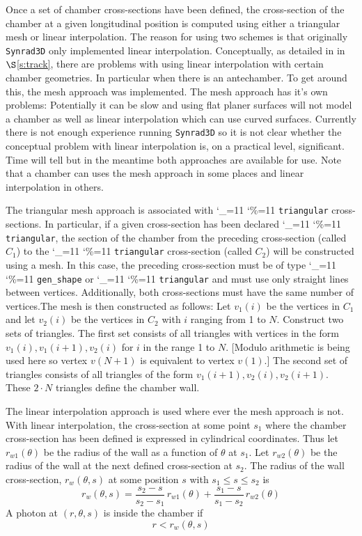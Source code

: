 \documentclass[11pt]{article}
\newcommand{\sref}[1]{$\S$\ref{#1}}
\newcommand{\srthree}{\texttt{Synrad3D}\xspace}
\newcommand\ttcmd{\begingroup\catcode`\_=11 \catcode`\%=11 \dottcmd}
\newcommand\dottcmd[1]{\texttt{#1}\endgroup}
\newcommand{\Begineq}{\begin{equation}}
\newcommand{\Endeq}{\end{equation}}
\newcommand{\vn}{\ttcmd}
\begin{document}
{Once a set of chamber cross-sections have been defined, the
cross-section of the chamber at a given longitudinal position is
computed using either a triangular mesh or linear interpolation. The
reason for using two schemes is that originally \srthree only
implemented linear interpolation.  Conceptually, as detailed in in
\sref{s:track}, there are problems with using linear interpolation
with certain chamber geometries. In particular when there is an
antechamber. To get around this, the mesh approach was implemented.
The mesh approach has it's own problems: Potentially it can be slow
and using flat planer surfaces will not model a chamber as well as
linear interpolation which can use curved surfaces. Currently there
is not enough experience running \srthree so it is not clear whether
the conceptual problem with linear interpolation is, on a practical
level, significant. Time will tell but in the meantime both approaches
are available for use. Note that a chamber can uses the mesh approach
in some places and linear interpolation in others.

The triangular mesh approach is associated with \vn{triangular}
cross-sections. In particular, if a given cross-section has been
declared \vn{triangular}, the section of the chamber from the
preceding cross-section (called $C_1$) to the \vn{triangular}
cross-section (called $C_2$) will be constructed using a mesh. In this
case, the preceding cross-section must be of type \vn{gen_shape} or
\vn{triangular} and must use only straight lines between
vertices. Additionally, both cross-sections must have the same number
of vertices.The mesh is then constructed as follows: Let $v_1(i)$ be
the vertices in $C_1$ and let $v_2(i)$ be the vertices in $C_2$ with
$i$ ranging from 1 to $N$. Construct two sets of triangles. The first
set consists of all triangles with vertices in the form $v_1(i),
v_1(i+1), v_2(i)$ for $i$ in the range 1 to $N$. [Modulo arithmetic is
being used here so vertex $v(N+1)$ is equivalent to vertex $v(1)$.]
The second set of triangles consists of all triangles of the form
$v_1(i+1), v_2(i), v_2(i+1)$. These $2 \cdot N$ triangles define the
chamber wall.

The linear interpolation approach is used where ever the mesh approach
is not.  With linear interpolation, the cross-section at some point
$s_1$ where the chamber cross-section has been defined is expressed in
cylindrical coordinates.  Thus let $r_{w1}(\theta)$ be the radius of
the wall as a function of $\theta$ at $s_1$.  Let $r_{w2}(\theta)$ be
the radius of the wall at the next defined cross-section at $s_2$. The
radius of the wall cross-section, $r_w(\theta, s)$ at some position
$s$ with $s_1 \le s \le s_2$ is
\Begineq
  r_w(\theta, s) = 
  \frac{s_2 - s}{s_2 - s_1} \, r_{w1}(\theta) + 
  \frac{s_1 - s}{s_1 - s_2} \, r_{w2}(\theta)
  \label{rssss}
\Endeq
A photon at $(r,\theta, s)$ is inside the chamber if
\Begineq
  r < r_w(\theta, s)
\Endeq

}
\end{document}
